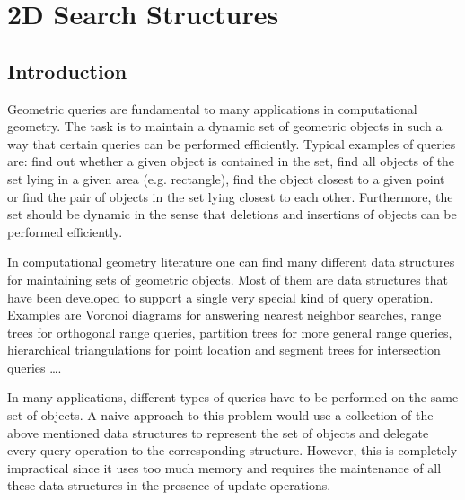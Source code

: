 
\ccParDims

\chapter{2D Search Structures}
\label{chapterPoint_set_2}

\minitoc

\section{Introduction}

Geometric queries are fundamental to many applications in computational
geometry. The task is to maintain a dynamic set of geometric objects
in such a way that certain queries can be performed efficiently.
Typical examples of queries are:
find out whether a given object is contained in the set,
find all objects of the set lying in a given area (e.g. rectangle),
find the object closest to a given point or
find the pair of objects in the set lying closest to each other. 
Furthermore, the set should be dynamic in the sense that deletions and 
insertions of objects can be performed efficiently.

In computational geometry literature one can find many different data structures for
maintaining sets of geometric objects. Most of them are data structures 
that have been developed to support a single very special kind of query 
operation.
Examples are Voronoi diagrams for answering nearest neighbor
searches, range trees for orthogonal range queries, partition trees
for more general range queries, hierarchical triangulations for point
location and segment trees for intersection queries \dots.

In many applications, different types of queries have to be
performed on the same set of objects. A naive approach to this
problem would use a collection of the above mentioned data structures to
represent the set of objects and delegate every query operation to
the corresponding structure.
However, this is completely impractical since it uses too much
memory and requires the maintenance of all these data structures in the presence of
update operations.

